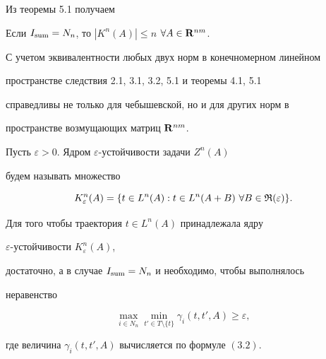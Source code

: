  


Из теоремы 5.1 получаем 


 


\begin{cors} 


Если $I_{\operatorname{sum}}=N_n$, то $|K^n(A)|\le n$ $\forall A\in\bold R^{nm}$. 


\end{cors} 


 


\begin{notes} 


С учетом эквивалентности любых двух норм в конечномерном линейном 


пространстве \cite{24} следствия 2.1, 3.1, 3.2, 5.1 и теоремы 4.1, 5.1 


справедливы не только для чебышевской, но и для других норм в 


пространстве возмущающих матриц $\bold R^{nm}$. 


\end{notes} 


 


Пусть $\varepsilon>0$. Ядром $\varepsilon$-устойчивости задачи $Z^n(A)$ 


будем называть множество


$$ 


K^n_\varepsilon(A)=\{t\in L^n(A):t\in L^n(A+B)\ \forall 


B\in\frak R(\varepsilon)\}. 


$$ 


 


\begin{thms} 


Для того чтобы траектория $t\in L^n(A)$ принадлежала ядру 


$\varepsilon$-устойчивости $K^n_\varepsilon(A)$, 


достаточно, а в случае $I_{\operatorname{sum}}=N_n$ и необходимо, чтобы выполнялось 


неравенство 


\begin{equation} 


\max_{i\in N_n}\min_{t'\in T\setminus\{t\}} 


\gamma_i(t,t',A)\ge\varepsilon, 


\end{equation} 


где величина $\gamma_i(t,t',A)$ вычисляется по формуле $(3.2)$. 


\end{thms} 


